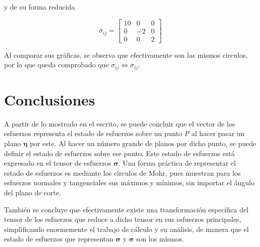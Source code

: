 \documentclass{article}
\begin{document}
    y de su forma reducida

    \begin{equation*}
        \overline{\sigma}_{ij} = 
        \begin{bmatrix}
            10 & 0 & 0\\
            0 & -2 & 0\\
            0 & 0 & 2
        \end{bmatrix}
    \end{equation*}

    Al comparar sus gr\'{a}ficas, se observa que efectivamente son las mismos circulos,
    por lo que queda comprobado que $\sigma_{ij} \Leftrightarrow \overline{\sigma}_{ij}$.


    \section{Conclusiones}
    A partir de lo mostrado en el escrito, se puede concluir que el vector de los esfuerzos
    representa  el estado de esfuerzos sobre un punto \textit{P} al hacer pasar un plano
    $\bm{\eta}$ por este. Al hacer un n\'{u}mero grande de planos por dicho punto, se puede
    definir el estado de esfuerzos sobre ese punto. Este estado de esfuerzos est\'{a} expresado
    en el tensor de esfuerzos $\bm{\sigma}$. Una forma pr\'{a}ctica de representar el estado de
    esfuerzos es mediante los c\'{i}rculos de Mohr, pues muestran para los esfuerzos normales 
    y tangenciales sus m\'{a}ximos y m\'{i}nimos, sin importar el \'{a}ngulo del plano de corte.

    Tambi\'{e}n se concluye que efectivamente existe una transformaci\'{o}n espec\'{i}fica del tensor
    de los esfuerzos que reduce a dicho tensor en sus esfuerzos principales, simplificando enormemente
    el trabajo de c\'{a}lculo y su an\'{a}lisis, de manera que el estado de esfuerzos que representan 
    $\bm{\sigma}$ y $\bm{\overline{\sigma}}$ son los m\'{i}smos.
\end{document}
